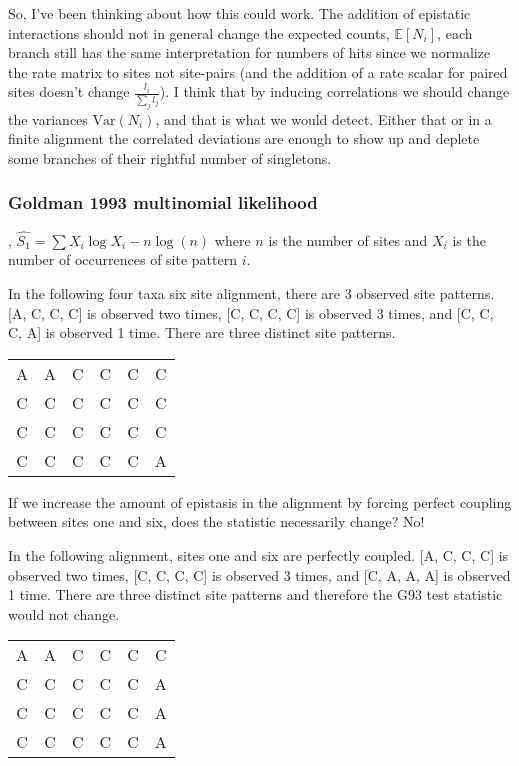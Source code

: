\documentclass[11pt]{article}
\begin{document}
So, I've been thinking about how this could work.
The addition of epistatic interactions should not in general change the expected counts, $\mathbb{E}[N_i]$, each branch still has the same interpretation for numbers of hits since we normalize the rate matrix to sites not site-pairs (and the addition of a rate scalar for paired sites doesn't change $\frac{l_i}{\sum_j l_j}$).
I think that by inducing correlations we should change the variances $\text{Var}(N_i)$, and that is what we would detect.
Either that or in a finite alignment the correlated deviations are enough to show up and deplete some branches of their rightful number of singletons.

\subsubsection*{Goldman 1993 multinomial likelihood}

\cite{goldman1993statistical}, $\hat{S_1} = \sum X_i \log{X_i} - n \log(n)$ where $n$ is the number of sites and $X_i$ is the number of occurrences of site pattern $i$. 

In the following four taxa six site alignment, there are 3 observed site patterns. 
[A, C, C, C] is observed two times, [C, C, C, C] is observed 3 times, and [C, C, C, A] is observed 1 time. 
There are three distinct site patterns. 

\begin{center}
\begin{tabular}{ |c|c|c|c|c|c|} 
 \hline
A & A & C &  C & C & C \\ 
C & C & C &  C & C & C \\ 
C & C & C &  C & C & C \\ 
C & C & C  &  C & C & A\\ 
 \hline
\end{tabular}
\end{center}

If we increase the amount of epistasis in the alignment by forcing perfect coupling between sites one and six, does the statistic necessarily change? 
No! 

In the following alignment, sites one and six are perfectly coupled. 
[A, C, C, C] is observed two times, [C, C, C, C] is observed 3 times, and [C, A, A, A] is observed 1 time. 
There are three distinct site patterns and therefore the G93 test statistic would not change. 

\begin{center}
\begin{tabular}{ |c|c|c|c|c|c|} 
 \hline
A & A & C &  C & C & C \\ 
C & C & C &  C & C & A \\ 
C & C & C &  C & C & A \\ 
C & C & C  &  C & C & A\\ 
 \hline
\end{tabular}
\end{center}
\end{document}
